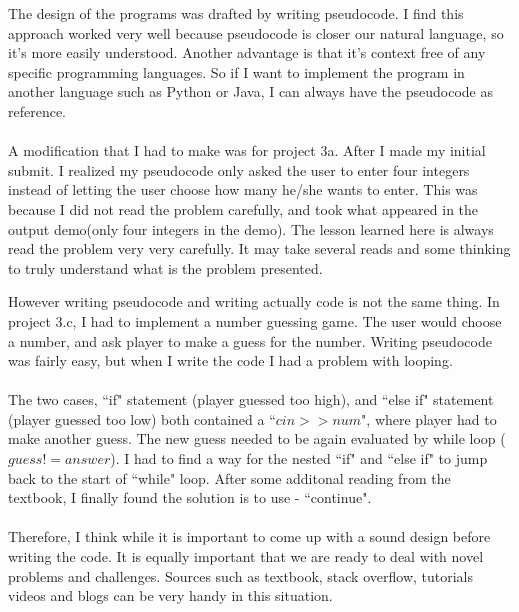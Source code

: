 \documentclass[11pt]{article}
\newenvironment{exercise}[2]{\begin{trivlist}
\item[\hskip \labelsep {\bfseries #1}\hskip \labelsep {\bfseries #2.}]}{\end{trivlist}}
\begin{document}
\begin{exercise}{Design}\\
The design of the programs was drafted by writing pseudocode. I find this approach
worked very well because pseudocode is closer our natural language, so it's
more easily understood. Another advantage is that it's context free of any
specific programming languages. So if I want to implement the program in
another language such as Python or Java, I can always have the pseudocode
as reference.\\
\\
A modification that I had to make was for project 3a. After I made
my initial submit. I realized my pseudocode only asked the user to enter four
integers instead of letting the user choose how many he/she wants to enter.
This was because I did not read the problem carefully, and took what
appeared in the output demo(only four integers in the demo). The lesson learned
here is always read the problem very very carefully. It may take several
reads and some thinking to truly understand what is the problem presented.\\

\end{exercise}

\begin{exercise}{Implemntation}\\
However writing pseudocode and writing actually code is not the same thing.
In project 3.c, I had to implement a number guessing game. The user would choose a
number, and ask player to make a guess for the number. Writing pseudocode
was fairly easy, but when I write the code I had a problem with looping.\\
\\
The two cases, ``if" statement (player guessed too high), and ``else if" statement
(player guessed too low) both contained a ``$cin >> num$", where player had to
make another guess. The new guess needed to be again evaluated by while loop
($guess != answer$). I had to find a way for the nested ``if" and
``else if" to jump back to the start of ``while" loop. After some
additonal reading from the textbook,
I finally found the solution is to use - ``continue".\\
\\
Therefore, I think while it is important to come up with a sound design
before writing the code. It is equally important that
we are ready to deal with novel problems and challenges. Sources such
as textbook, stack overflow, tutorials videos and blogs can be very handy in
this situation.\\
\end{exercise}
\end{document}

